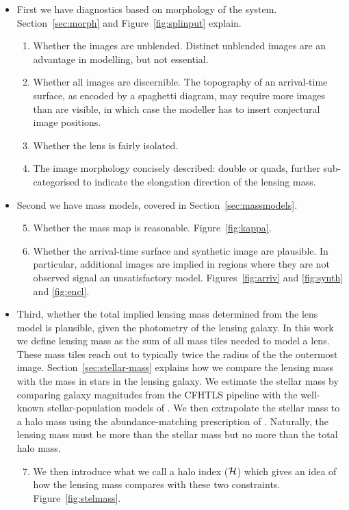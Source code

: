 \begin{itemize}
\item First we have diagnostics based on morphology of the
  system.
  Section~\ref{sec:morph} and Figure~\ref{fig:splinput} explain.
\begin{enumerate}
\item Whether the images are unblended.  Distinct unblended images are
  an advantage in modelling, but not essential.
\item Whether all images are discernible.  The topography of an
  arrival-time surface, as encoded by a spaghetti diagram, may require
  more images than are visible, in which case the modeller has to
  insert conjectural image positions.
\item Whether the lens is fairly isolated.
\item The image morphology concisely described: double or quads,
  further sub-categorised to indicate the elongation direction of the
  lensing mass.
\end{enumerate}
\item Second we have mass models, covered in Section~\ref{sec:massmodels}.
\begin{enumerate}
\setcounter{enumi}{4}
\item Whether the mass map is reasonable. Figure~\ref{fig:kappa}.
\item Whether the arrival-time surface and synthetic image are
  plausible.  In particular, additional images are implied in regions
  where they are not observed signal an unsatisfactory model.
  Figures~\ref{fig:arriv} and \ref{fig:synth} and \ref{fig:encl}.
\end{enumerate}
\item Third, whether the total implied lensing mass
  determined from the lens model is plausible, given the
  photometry of the lensing galaxy.
  In this work we define lensing mass as the sum of all mass tiles
  needed to model a lens. These mass tiles reach out to typically twice
  the radius of the the outermost image.
  Section~\ref{sec:stellar-mass}
  explains how we compare the lensing mass with the mass in stars in
  the lensing galaxy.  We estimate the stellar mass by comparing
  galaxy magnitudes from the CFHTLS pipeline with the well-known
  stellar-population models of \cite{2003MNRAS.344.1000B}.  We then
  extrapolate the stellar mass to a halo mass using the
  abundance-matching prescription of \cite{2010ApJ...710..903M}.
  Naturally, the lensing mass must be more than the stellar mass but
  no more than the total halo mass.
\begin{enumerate}
\setcounter{enumi}{6}
\item We then introduce what we call a halo index ($\mathcal{H}$) which
  gives an idea of how the lensing mass compares with these two
  constraints.  Figure~\ref{fig:stelmass}.
\end{enumerate}
\end{itemize}






